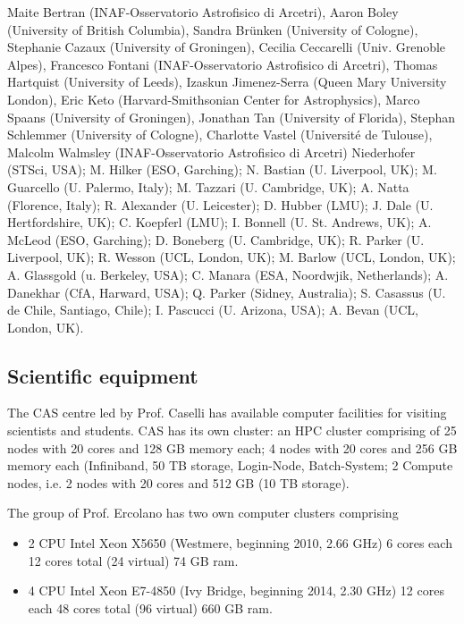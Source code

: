 \documentclass[10pt,fleqn,twoside]{article}
\newcommand{\Tcol}{\color{blue}}
\begin{document}
Maite Bertran (INAF-Osservatorio Astrofisico di Arcetri), Aaron Boley (University of British Columbia), Sandra Brünken (University of Cologne), Stephanie Cazaux (University of Groningen), Cecilia Ceccarelli (Univ. Grenoble Alpes), Francesco Fontani (INAF-Osservatorio Astrofisico di Arcetri), Thomas Hartquist (University of Leeds), Izaskun Jimenez-Serra (Queen Mary University London), Eric Keto (Harvard-Smithsonian Center for Astrophysics), Marco Spaans (University of Groningen), Jonathan Tan (University of Florida), Stephan Schlemmer (University of Cologne), Charlotte Vastel (Université de Tulouse), Malcolm Walmsley (INAF-Osservatorio Astrofisico di Arcetri)
 Niederhofer (STSci, USA); M. Hilker (ESO, Garching); N. Bastian (U. Liverpool,
UK); M. Guarcello (U. Palermo, Italy); M. Tazzari (U. Cambridge, UK);
A. Natta (Florence, Italy); R. Alexander (U. Leicester); D. Hubber
(LMU); J. Dale (U. Hertfordshire, UK); C. Koepferl (LMU); I. Bonnell
(U. St. Andrews, UK); A. McLeod (ESO, Garching); D. Boneberg
(U. Cambridge, UK); R. Parker (U. Liverpool, UK); R. Wesson (UCL,
London, UK); M. Barlow (UCL, London, UK); A. Glassgold (u. Berkeley,
USA); C. Manara (ESA, Noordwjik, Netherlands); A. Danekhar (CfA,
Harward, USA); Q. Parker (Sidney, Australia); S. Casassus
(U. de Chile, Santiago, Chile); I. Pascucci (U. Arizona, USA);
A. Bevan (UCL, London, UK).

\subsection{\Tcol Scientific equipment}

The CAS centre led by Prof. Caselli has available computer facilities for visiting scientists and students. CAS has its own cluster: an HPC cluster comprising of 25 nodes with 20 cores and 128 GB memory each; 4 nodes with 20 cores and 256 GB memory each (Infiniband, 50 TB storage, Login-Node, Batch-System; 2 Compute nodes, i.e. 2 nodes with 20 cores and 512 GB (10 TB storage). 


The group of Prof. Ercolano has two own computer clusters comprising 

\begin{itemize}
\item 2 CPU Intel Xeon X5650 (Westmere, beginning
2010, 2.66 GHz) 6 cores each 12 cores total (24 virtual) 74 GB ram.

\item 4 CPU Intel Xeon E7-4850 (Ivy Bridge, beginning 2014, 2.30 GHz)
12 cores each 48 cores total (96 virtual) 660 GB ram.

\end{itemize}
\end{document}
